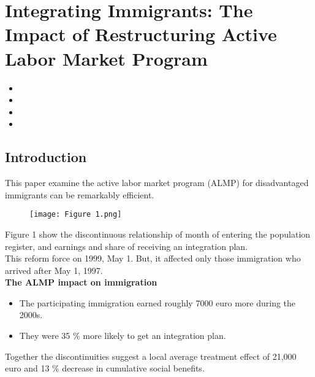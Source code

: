 \documentclass[../root]{subfiles}
\begin{document}
    \chapter{Integrating Immigrants: The Impact of Restructuring Active Labor Market Program}

    \begin{shortsummary}
        \begin{itemize}
            \item {} %
            \item {}
            \item {}
            \item {}
        \end{itemize}
    \end{shortsummary}

    \section{Introduction}

    This paper examine the active labor market program (ALMP) for disadvantaged immigrants can be remarkably efficient. \\
    
    \begin{figure}[h]
        \texttt{[image: Figure 1.png]}
    \end{figure}
    
    Figure 1 show the discontinuous relationship of month of entering the population register, and earnings and share of receiving an integration plan.  \\  
    This reform force on 1999, May 1. But, it affected only those immigration who arrived after May 1, 1997. \\
    {\bf The ALMP impact on immigration }
    \begin{itemize}
        \item The participating immigration earned roughly 7000 euro more during the 2000s.
        \item They were 35 \% more likely to get an integration plan.
    \end{itemize}
        Together the discontinuities suggest a local average treatment effect of 21,000 euro and 13 \% decrease in cumulative social benefits. \\
        
\end{document}
